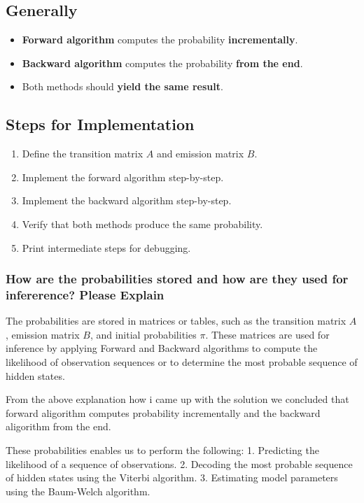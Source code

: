 \documentclass{article}
\begin{document}
\subsection*{Generally}
\begin{itemize}
    \item \textbf{Forward algorithm} computes the probability \textbf{incrementally}.
    \item \textbf{Backward algorithm} computes the probability \textbf{from the end}.
    \item Both methods should \textbf{yield the same result}.
\end{itemize}

\subsection*{Steps for Implementation}
\begin{enumerate}
    \item Define the transition matrix \( A \) and emission matrix \( B \).
    \item Implement the forward algorithm step-by-step.
    \item Implement the backward algorithm step-by-step.
    \item Verify that both methods produce the same probability.
    \item Print intermediate steps for debugging.
\end{enumerate}

\subsubsection*{How are the probabilities stored and how are they used for infererence? Please Explain}
The probabilities are stored in matrices or tables, such as the transition matrix \(A\), 
emission matrix \(B\), and initial probabilities \(\pi\). These matrices are used for inference 
by applying Forward and Backward algorithms to compute the likelihood of observation sequences or
 to determine the most probable sequence of hidden states.

From the above explanation how i came up with the solution we concluded that forward aligorithm computes probability incrementally
and the backward aligorithm from the end.

These probabilities enables us to perform the following:
1. Predicting the likelihood of a sequence of observations.
2. Decoding the most probable sequence of hidden states using the Viterbi algorithm.
3. Estimating model parameters using the Baum-Welch algorithm.
\end{document}
